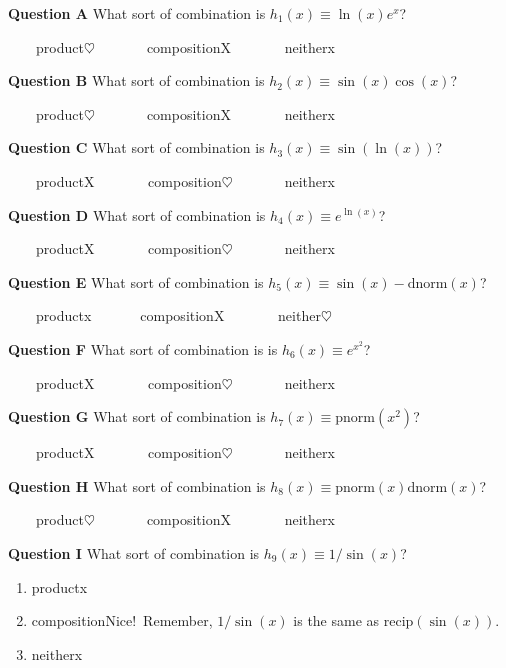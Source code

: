 \documentclass[
  letterpaper,
  DIV=11,
  numbers=noendperiod,
  oneside]{article}
\providecommand{\tightlist}{%
  \setlength{\itemsep}{0pt}\setlength{\parskip}{0pt}}\usepackage{longtable,booktabs,array}
\newcommand{\recip}{\text{recip}}
\newcommand{\pnorm}{\text{pnorm}}
\newcommand{\dnorm}{\text{dnorm}}
\begin{document}
\begin{multicols}{2}
\textbf{Question A} What sort of combination is
\(h_1(x)\equiv \ln(x) e^x\)?

~~~~{product{\(\heartsuit\ \)}}~~~~~~~{composition{︎X
}}~~~~~~~{neither{x}}

\textbf{Question B} What sort of combination is
\(h_2(x)\equiv \sin(x) \cos(x)\)?

~~~~{product{\(\heartsuit\ \)}}~~~~~~~{composition{︎X
}}~~~~~~~{neither{x}}

\textbf{Question C} What sort of combination is
\(h_3(x) \equiv \sin(\ln(x))\)?

~~~~{product{︎X
}}~~~~~~~{composition{\(\heartsuit\ \)}}~~~~~~~{neither{x}}

\textbf{Question D} What sort of combination is
\(h_4(x) \equiv e^{\ln(x)}\)?

~~~~{product{︎X
}}~~~~~~~{composition{\(\heartsuit\ \)}}~~~~~~~{neither{x}}

\textbf{Question E} What sort of combination is
\(h_5(x) \equiv \sin(x) - \dnorm(x)\)?

~~~~{product{x}}~~~~~~~{composition{︎X
}}~~~~~~~{neither{\(\heartsuit\ \)}}

\textbf{Question F} What sort of combination is is
\(h_6(x) \equiv e^{x^2}\)?

~~~~{product{︎X
}}~~~~~~~{composition{\(\heartsuit\ \)}}~~~~~~~{neither{x}}

\textbf{Question G} What sort of combination is
\(h_7(x) \equiv \pnorm(x^2)\)?

~~~~{product{︎X
}}~~~~~~~{composition{\(\heartsuit\ \)}}~~~~~~~{neither{x}}

\textbf{Question H} What sort of combination is
\(h_8(x) \equiv \pnorm(x) \dnorm(x)\)?

~~~~{product{\(\heartsuit\ \)}}~~~~~~~{composition{︎X
}}~~~~~~~{neither{x}}

\textbf{Question I} What sort of combination is
\(h_9(x) \equiv 1/\sin(x)\)?

\begin{enumerate}
\def\labelenumi{\roman{enumi}.}
\tightlist
\item
  {product{x}}\\
\item
  {composition{Nice!~Remember, \(1/\sin(x)\) is the same as
  \(\recip(\sin(x))\).}}\\
\item
  {neither{x}}
\end{enumerate}

\end{multicols}
\end{document}

